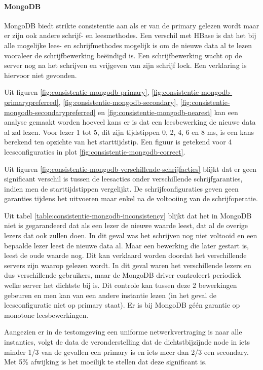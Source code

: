 \paragraph{MongoDB} MongoDB biedt strikte consistentie aan als er van de primary gelezen wordt maar er zijn ook andere schrijf- en leesmethodes. Een verschil met HBase is dat het bij alle mogelijke lees- en schrijfmethodes mogelijk is om de nieuwe data al te lezen vooraleer de schrijfbewerking beëindigd is. Een schrijfbewerking wacht op de server nog na het schrijven en vrijgeven van zijn schrijf lock. Een verklaring is hiervoor niet gevonden.

Uit figuren \ref{fig:consistentie-mongodb-primary}, \ref{fig:consistentie-mongodb-primarypreferred}, \ref{fig:consistentie-mongodb-secondary}, \ref{fig:consistentie-mongodb-secondarypreferred} en \ref{fig:consistentie-mongodb-nearest} kan een analyse gemaakt worden hoeveel kans er is dat een leesbewerking de nieuwe data al zal lezen. Voor lezer 1 tot 5, dit zijn tijdstippen 0, 2, 4, 6 en 8 ms, is een kans berekend ten opzichte van het starttijdstip. Een figuur is getekend voor 4 leesconfiguraties in plot \ref{fig:consistentie-mongodb-correct}. 

Uit figuren \ref{fig:consistentie-mongodb-verschillende-schrijfacties} blijkt dat er geen significant verschil is tussen de leesacties onder verschillende schrijfgaranties, indien men de starttijdstippen vergelijkt. De schrijfconfiguraties geven geen garanties tijdens het uitvoeren maar enkel na de voltooiing van de schrijfoperatie.  

Uit tabel \ref{table:consistentie-mongodb-inconsistency} blijkt dat het in MongoDB niet is gegarandeerd dat als een lezer de nieuwe waarde leest, dat al de overige lezers dat ook zullen doen. In dit geval was het schrijven nog niet voltooid en een bepaalde lezer leest de nieuwe data al. Maar een bewerking die later gestart is, leest de oude waarde nog. Dit kan verklaard worden doordat het verschillende servers zijn waarop gelezen wordt. In dit geval waren het verschillende lezers en dus verschillende gebruikers, maar de MongoDB driver controleert periodiek welke server het dichtste bij is. Dit controle kan tussen deze 2 bewerkingen gebeuren en men kan van een andere instantie lezen (in het geval de leesconfiguratie niet op primary staat). Er is bij MongoDB géén garantie op monotone leesbewerkingen. 

Aangezien er in de testomgeving een uniforme netwerkvertraging is naar alle instanties, volgt de data de veronderstelling dat de dichtstbijzijnde node in iets minder 1/3 van de gevallen een primary is en iets meer dan 2/3 een secondary. Met 5\% afwijking is het moeilijk te stellen dat deze significant is. 

